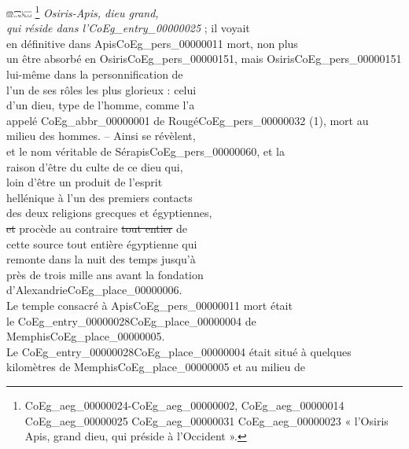 \documentclass{book}
\begin{document}
{\begin{paracol}{2}
\includegraphics[height=6pt]{CoEg_Mariette_hiero_1857-04-01_19_2.png} \footnote{\foreignlanguage{translit}{\gls{CoEg_aeg_00000024}-\gls{CoEg_aeg_00000002}, \gls{CoEg_aeg_00000014} \gls{CoEg_aeg_00000025} \gls{CoEg_aeg_00000031} \gls{CoEg_aeg_00000023}} « l'Osiris Apis, grand dieu, qui préside à l'Occident ».} \textit{Osiris-Apis, dieu grand,\\
qui réside dans l’\gls{CoEg_entry_00000025}} ; il voyait\\
en définitive dans Apis\gls{CoEg_pers_00000011} mort, non plus\\
un être absorbé en Osiris\gls{CoEg_pers_00000151}, mais Osiris\gls{CoEg_pers_00000151}\\
lui-même dans la personnification de\\
l’un de ses rôles les plus glorieux : celui\\
d’un dieu, type de l’homme, comme l’a\\
appelé \gls{CoEg_abbr_00000001} de Rougé\gls{CoEg_pers_00000032} (1), mort au\\
milieu des hommes. – Ainsi se révèlent,\\
et le nom véritable de Sérapis\gls{CoEg_pers_00000060}, et la\\
raison d’être du culte de ce dieu qui,\\
loin d’être un produit de l’esprit\\
hellénique à l’un des premiers contacts\\
des deux religions grecques et égyptiennes,\\
\sout{et} procède au contraire \sout{tout entier} de\\
cette source tout entière égyptienne qui\\
remonte dans la nuit des temps jusqu’à\\
près de trois mille ans avant la fondation\\
d’Alexandrie\gls{CoEg_place_00000006}.\\
\indent Le temple consacré à Apis\gls{CoEg_pers_00000011} mort était\\
le \Gls{CoEg_entry_00000028}\gls{CoEg_place_00000004} de Memphis\gls{CoEg_place_00000005}.\\
\indent Le \Gls{CoEg_entry_00000028}\gls{CoEg_place_00000004} était situé à quelques\\
kilomètres de Memphis\gls{CoEg_place_00000005} et au milieu de\\

\end{paracol}}
\end{document}
